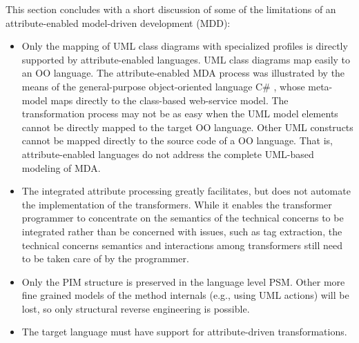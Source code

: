 \noindent This section concludes with a short discussion of some of the limitations of an attribute-enabled model-driven development (MDD): 
\begin{itemize}
\item Only the mapping of UML class diagrams with specialized profiles is directly supported by attribute-enabled languages. UML class diagrams map easily to an OO language. The attribute-enabled MDA process was illustrated by the means of the general-purpose object-oriented language C\# \cite{www.dotnet}, whose meta-model maps directly to the class-based web-service model. The transformation process may not be as easy when the UML model elements cannot be directly mapped to the target OO language. Other UML constructs cannot be mapped directly to the source code of a OO language. That is, attribute-enabled languages do not address the complete UML-based modeling of MDA.  %

\item
The integrated attribute processing greatly facilitates, but does not automate the implementation of the transformers. While it enables the transformer programmer to concentrate on the semantics of the technical concerns to be integrated rather than be concerned with issues, such as tag extraction, the technical concerns semantics and interactions among transformers still need to be taken care of by the programmer. 
\item
Only the PIM structure is preserved in the language level PSM. Other more fine grained models of the method internals (e.g., using UML actions) will be lost, so only structural reverse engineering is possible. 
\item
The target language must have support for attribute-driven transformations.
\end{itemize}


